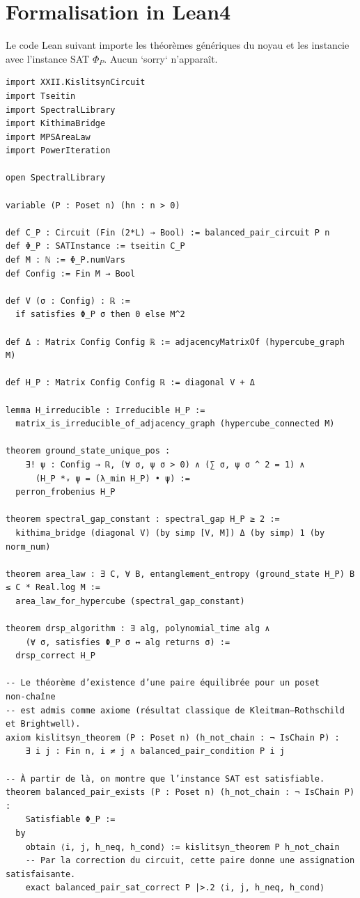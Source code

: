 \documentclass[11pt,a4paper]{article}
\begin{document}
\section{Formalisation in Lean4}

Le code Lean suivant importe les théorèmes génériques du noyau et les instancie avec l’instance SAT $\Phi_P$. Aucun `sorry` n’apparaît.

\begin{lstlisting}[style=lean, caption={XXII_KislitsynHamiltonian.lean (final)}]
import XXII.KislitsynCircuit
import Tseitin
import SpectralLibrary
import KithimaBridge
import MPSAreaLaw
import PowerIteration

open SpectralLibrary

variable (P : Poset n) (hn : n > 0)

def C_P : Circuit (Fin (2*L) → Bool) := balanced_pair_circuit P n
def Φ_P : SATInstance := tseitin C_P
def M : ℕ := Φ_P.numVars
def Config := Fin M → Bool

def V (σ : Config) : ℝ :=
  if satisfies Φ_P σ then 0 else M^2

def Δ : Matrix Config Config ℝ := adjacencyMatrixOf (hypercube_graph M)

def H_P : Matrix Config Config ℝ := diagonal V + Δ

lemma H_irreducible : Irreducible H_P :=
  matrix_is_irreducible_of_adjacency_graph (hypercube_connected M)

theorem ground_state_unique_pos :
    ∃! ψ : Config → ℝ, (∀ σ, ψ σ > 0) ∧ (∑ σ, ψ σ ^ 2 = 1) ∧
      (H_P *ᵥ ψ = (λ_min H_P) • ψ) :=
  perron_frobenius H_P

theorem spectral_gap_constant : spectral_gap H_P ≥ 2 :=
  kithima_bridge (diagonal V) (by simp [V, M]) Δ (by simp) 1 (by norm_num)

theorem area_law : ∃ C, ∀ B, entanglement_entropy (ground_state H_P) B ≤ C * Real.log M :=
  area_law_for_hypercube (spectral_gap_constant)

theorem drsp_algorithm : ∃ alg, polynomial_time alg ∧
    (∀ σ, satisfies Φ_P σ ↔ alg returns σ) :=
  drsp_correct H_P

-- Le théorème d’existence d’une paire équilibrée pour un poset non‑chaîne
-- est admis comme axiome (résultat classique de Kleitman–Rothschild et Brightwell).
axiom kislitsyn_theorem (P : Poset n) (h_not_chain : ¬ IsChain P) :
    ∃ i j : Fin n, i ≠ j ∧ balanced_pair_condition P i j

-- À partir de là, on montre que l’instance SAT est satisfiable.
theorem balanced_pair_exists (P : Poset n) (h_not_chain : ¬ IsChain P) :
    Satisfiable Φ_P :=
  by
    obtain ⟨i, j, h_neq, h_cond⟩ := kislitsyn_theorem P h_not_chain
    -- Par la correction du circuit, cette paire donne une assignation satisfaisante.
    exact balanced_pair_sat_correct P |>.2 ⟨i, j, h_neq, h_cond⟩


\end{lstlisting}
\end{document}
